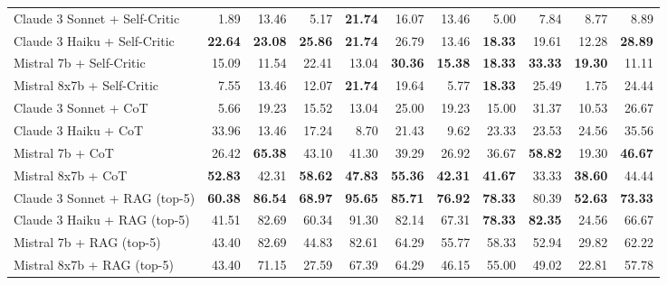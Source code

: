 \begin{table}[H]
{\begin{tabular}{lrrrrrrrrrr}
\rowcolor{Gray}
Claude 3 Sonnet + Self-Critic & 1.89 & 13.46 & 5.17 & \textbf{21.74} & 16.07 & 13.46 & 5.00 & 7.84 & 8.77 & 8.89 \\
\rowcolor{Gray}
Claude 3 Haiku + Self-Critic & \textbf{22.64} & \textbf{23.08} & \textbf{25.86} & \textbf{21.74} & 26.79 & 13.46 & \textbf{18.33} & 19.61 & 12.28 & \textbf{28.89} \\
\rowcolor{Gray}
Mistral 7b + Self-Critic & 15.09 & 11.54 & 22.41 & 13.04 & \textbf{30.36} & \textbf{15.38} & \textbf{18.33} & \textbf{33.33} & \textbf{19.30} & 11.11 \\
\rowcolor{Gray}
Mistral 8x7b + Self-Critic & 7.55 & 13.46 & 12.07 & \textbf{21.74} & 19.64 & 5.77 & \textbf{18.33} & 25.49 & 1.75 & 24.44 \\
Claude 3 Sonnet + CoT & 5.66 & 19.23 & 15.52 & 13.04 & 25.00 & 19.23 & 15.00 & 31.37 & 10.53 & 26.67 \\
Claude 3 Haiku + CoT & 33.96 & 13.46 & 17.24 & 8.70 & 21.43 & 9.62 & 23.33 & 23.53 & 24.56 & 35.56 \\
Mistral 7b + CoT & 26.42 & \textbf{65.38} & 43.10 & 41.30 & 39.29 & 26.92 & 36.67 & \textbf{58.82} & 19.30 & \textbf{46.67} \\
Mistral 8x7b + CoT & \textbf{52.83} & 42.31 & \textbf{58.62} & \textbf{47.83} & \textbf{55.36} & \textbf{42.31} & \textbf{41.67} & 33.33 & \textbf{38.60} & 44.44 \\
\rowcolor{Gray}
Claude 3 Sonnet + RAG (top-5) & \textbf{60.38} & \textbf{86.54} & \textbf{68.97} & \textbf{95.65} & \textbf{85.71} & \textbf{76.92} & \textbf{78.33} & 80.39 & \textbf{52.63} & \textbf{73.33} \\
\rowcolor{Gray}
Claude 3 Haiku + RAG (top-5) & 41.51 & 82.69 & 60.34 & 91.30 & 82.14 & 67.31 & \textbf{78.33} & \textbf{82.35} & 24.56 & 66.67 \\
\rowcolor{Gray}
Mistral 7b + RAG (top-5) & 43.40 & 82.69 & 44.83 & 82.61 & 64.29 & 55.77 & 58.33 & 52.94 & 29.82 & 62.22 \\
\rowcolor{Gray}
Mistral 8x7b + RAG (top-5) & 43.40 & 71.15 & 27.59 & 67.39 & 64.29 & 46.15 & 55.00 & 49.02 & 22.81 & 57.78 \\
\bottomrule
\end{tabular}
}

\vspace{2mm}


\end{table}
